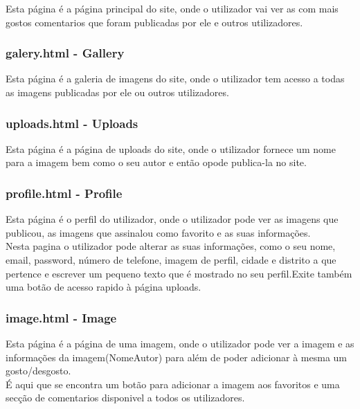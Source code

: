 \documentclass{report}
\begin{document}
\indent Esta página é a página principal do site, onde o utilizador vai ver as com mais gostos comentarios que foram publicadas por ele e outros utilizadores.\\


\subsubsection{galery.html - Gallery}

\indent Esta página é a galeria de imagens do site, onde o utilizador tem acesso a todas as imagens publicadas por ele ou outros utilizadores.\\

\subsubsection{uploads.html - Uploads}

\indent Esta página é a página de uploads do site, onde o utilizador fornece um nome para a imagem bem como o seu autor e então opode publica-la no site.\\

\subsubsection{profile.html - Profile}

\indent Esta página é o perfil do utilizador, onde o utilizador pode ver as imagens que publicou, as imagens que assinalou como favorito e as suas informações.\\
\indent Nesta pagina o utilizador pode alterar as suas informações, como o seu nome, email, password, número de telefone, imagem de perfil, cidade e distrito a que pertence e escrever um pequeno texto que é mostrado no seu perfil.Exite  também uma botão de acesso rapido à página uploads.\\


\subsubsection{image.html - Image}

\indent Esta página é a página de uma imagem, onde o utilizador pode ver a imagem  e as informações da imagem(NomeAutor) para além de poder adicionar à mesma um gosto/desgosto.\\
\indent É aqui que se encontra um botão para adicionar a imagem aos favoritos e uma secção de comentarios disponivel a todos os utilizadores.\\
\end{document}
